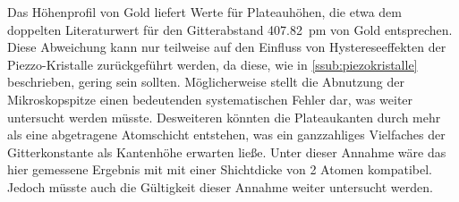 Das Höhenprofil von Gold liefert Werte für Plateauhöhen, die etwa dem doppelten
Literaturwert für den Gitterabstand \SI{407.82}{\pico\meter} von Gold
entsprechen. Diese Abweichung kann nur teilweise auf den Einfluss von
Hystereseeffekten der Piezzo-Kristalle zurückgeführt werden, da diese, wie in
\ref{ssub:piezokristalle} beschrieben, gering sein sollten. Möglicherweise
stellt die Abnutzung der Mikroskopspitze einen bedeutenden systematischen
Fehler dar, was weiter untersucht werden müsste. Desweiteren könnten die
Plateaukanten durch mehr als eine abgetragene Atomschicht entstehen, was ein
ganzzahliges Vielfaches der Gitterkonstante als Kantenhöhe erwarten ließe.
Unter dieser Annahme wäre das hier gemessene Ergebnis mit mit einer Shichtdicke
von \num{2} Atomen kompatibel. Jedoch müsste auch die Gültigkeit dieser Annahme
weiter untersucht werden.
